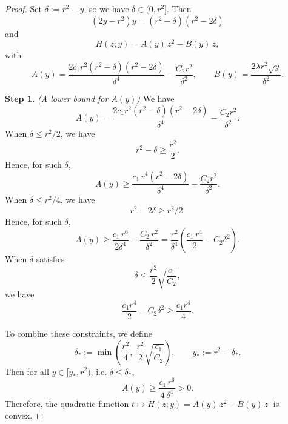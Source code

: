 \documentclass[12pt]{amsart}
\numberwithin{equation}{section}
\begin{document}
\begin{proof}
Set $\delta := r^{2}-y$, so we have $\delta \in (0,r^2]$. Then
\begin{equation*}
    (2y-r^{2})y = (r^{2}-\delta)(r^{2}-2\delta)
\end{equation*}
and
\begin{equation*}
    H(z;y) = A(y)\, z^2 - B(y)\, z,
\end{equation*}
with
\begin{equation*}
    A(y) = \frac{2c_{1}r^{2}(r^{2}-\delta)(r^{2}-2\delta)}{\delta^4} - \frac{C_{2}r^{2}}{\delta^2},
    \qquad
    B(y) = \frac{2\lambda r^{2} \sqrt{y}}{\delta^2}.
\end{equation*}

\textbf{Step 1.} \textit{(A lower bound for $A(y)$)} 
We have
\begin{equation*}
    A(y) = \frac{2c_{1}r^{2}(r^{2}-\delta)(r^{2}-2\delta)}{\delta^4} - \frac{C_{2}r^{2}}{\delta^2}.
\end{equation*}
\textbullet\; When $\delta \leq r^{2}/2$, we have
\begin{equation*}
    r^{2}-\delta \geq \frac{r^{2}}{2}.
\end{equation*}
Hence, for such $\delta$,
\begin{equation*}
    A(y) \geq \frac{c_{1}\,r^4(r^{2}-2\delta)}{\delta^4} - \frac{C_{2}r^{2}}{\delta^2}.
\end{equation*}
\textbullet\; When $\delta \leq r^{2}/4$, we have 
\begin{equation*}
    r^{2}-2\delta \geq r^{2}/2.
\end{equation*}
Hence, for such $\delta$,
\begin{equation*}
    A(y) \geq \frac{c_{1}\, r^6}{2\delta^4} - \frac{C_{2}\,r^{2}}{\delta^2} = \frac{r^{2}}{\delta^4} \left( \frac{c_{1}\, r^4}{2} - C_{2}\delta^2 \right).
\end{equation*}
\textbullet\; When $\delta$ satisfies
\begin{equation*}
    \delta \leq \frac{r^{2}}{2} \sqrt{\frac{c_{1}}{C_{2}}},
\end{equation*}
we have
\begin{equation*}
    \frac{c_{1} r^4}{2} - C_{2}\delta^2 \geq \frac{c_{1} r^4}{4}.
\end{equation*}

To combine these constraints, we define
\begin{equation*}
    \delta_* := \min\left( \frac{r^{2}}{4},\; \frac{r^{2}}{2}\sqrt{\frac{c_{1}}{C_{2}}} \right),
    \qquad
    y_* := r^{2} - \delta_*.
\end{equation*}
Then for all $y \in [y_*, r^{2})$, i.e. $\delta \leq \delta_*$,
\begin{equation*}
    A(y) \geq \frac{c_{1}\, r^6}{4\, \delta^4} > 0.
\end{equation*}
Therefore, the quadratic function $t\mapsto H(z;y)=A(y)\, z^2 - B(y)\, z\;$ is convex. 



\end{proof}
\end{document}
